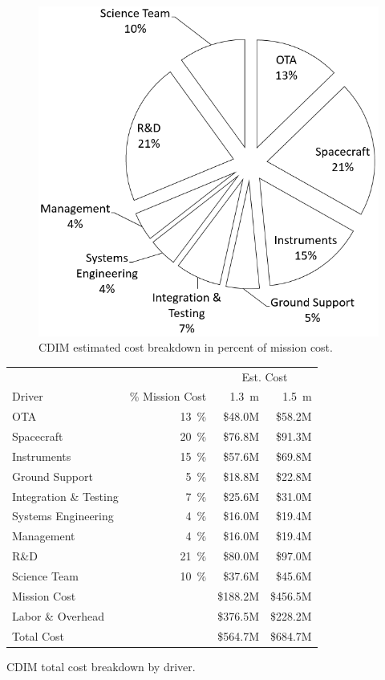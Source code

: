 \documentclass{ws-jai}
\begin{document}
\begin{figure}
  \centering
    \centering
    \includegraphics[width=.6\linewidth]{figs/cost-breakdown-pie.png}
    \caption{CDIM estimated cost breakdown in percent of mission cost.
\label{fig:cost-breakdown}
}
\end{figure}
\begin{wstable}
  \centering
  \begin{tabular}{@{}lrrr@{}}\toprule
                          &                   & \multicolumn{2}{c}{Est. Cost} \\
    Driver                & \% Mission Cost   & \SI{1.3}{\meter} & \SI{1.5}{\meter} \\ \midrule
    OTA                   & \SI{13}{\percent} & \$48.0M & \$58.2M \\
    Spacecraft            & \SI{20}{\percent} & \$76.8M & \$91.3M \\
    Instruments           & \SI{15}{\percent} & \$57.6M & \$69.8M \\
    Ground Support        & \SI{5}{\percent}  & \$18.8M & \$22.8M \\
    Integration \& Testing & \SI{7}{\percent} & \$25.6M & \$31.0M \\
    Systems Engineering   & \SI{4}{\percent}  & \$16.0M & \$19.4M \\
    Management            & \SI{4}{\percent}  & \$16.0M & \$19.4M \\
    R\&D                  & \SI{21}{\percent} & \$80.0M & \$97.0M \\
    Science Team          & \SI{10}{\percent} & \$37.6M & \$45.6M \\ \midrule
    Mission Cost          &                   & \$188.2M & \$456.5M \\
    Labor \& Overhead     &                   & \$376.5M & \$228.2M \\
    Total Cost            &                   & \$564.7M & \$684.7M \\ \bottomrule
  \end{tabular}
  \caption{CDIM total cost breakdown by driver.
\label{tab:total-cost}
}
\end{wstable}
\end{document}
